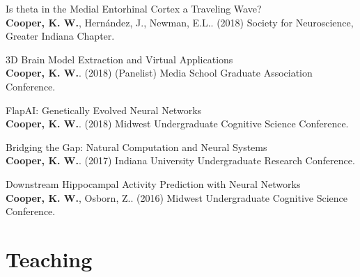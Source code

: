 \documentclass[10pt]{cooperCV2}
\begin{document}
\begin{etaremune}[itemindent=-1.5\bibhang, topsep=0pt,
				   itemsep=\bibsep,partopsep=0pt,parsep=0pt,leftmargin={\bibhang+\widthof{[999]}}]
	
    \item Is theta in the Medial Entorhinal Cortex a Traveling Wave?\\ \textbf{Cooper, K. W.}, Hernández, J., Newman, E.L.. (2018) Society for Neuroscience, Greater Indiana Chapter. 
     
	
    \item 3D Brain Model Extraction and Virtual Applications\\ \textbf{Cooper, K. W.}. (2018) (Panelist) Media School Graduate Association Conference. 
     
	
    \item FlapAI: Genetically Evolved Neural Networks\\ \textbf{Cooper, K. W.}. (2018) Midwest Undergraduate Cognitive Science Conference. 
     
	
    \item Bridging the Gap: Natural Computation and Neural Systems\\ \textbf{Cooper, K. W.}. (2017) Indiana University Undergraduate Research Conference. 
     
	
    \item Downstream Hippocampal Activity Prediction with Neural Networks\\ \textbf{Cooper, K. W.}, Osborn, Z.. (2016) Midwest Undergraduate Cognitive Science Conference. 
     
	


\end{etaremune}







%	






\section{Teaching}
\end{document}
